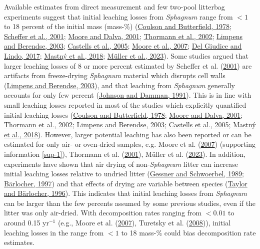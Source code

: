 \documentclass[
  12pt,
]{article}
\begin{document}
Available estimates from direct measurement and few two-pool litterbag experiments suggest that initial leaching losses from \emph{Sphagnum} range from \(<1\) to 18 percent of the initial mass (mass-\%) (\protect\hyperlink{ref-Coulson.1978}{Coulson and Butterfield, 1978}; \protect\hyperlink{ref-Scheffer.2001}{Scheffer et al., 2001}; \protect\hyperlink{ref-Moore.2001}{Moore and Dalva, 2001}; \protect\hyperlink{ref-Thormann.2002}{Thormann et al., 2002}; \protect\hyperlink{ref-Limpens.2003}{Limpens and Berendse, 2003}; \protect\hyperlink{ref-Castells.2005}{Castells et al., 2005}; \protect\hyperlink{ref-Moore.2007}{Moore et al., 2007}; \protect\hyperlink{ref-DelGiudice.2017}{Del Giudice and Lindo, 2017}; \protect\hyperlink{ref-Mastny.2018}{Mastný et al., 2018}; \protect\hyperlink{ref-Muller.2023}{Müller et al., 2023}). Some studies argued that larger leaching losses of 8 or more percent estimated by Scheffer et al. (\protect\hyperlink{ref-Scheffer.2001}{2001}) are artifacts from freeze-drying \emph{Sphagnum} material which disrupts cell walls (\protect\hyperlink{ref-Limpens.2003}{Limpens and Berendse, 2003}), and that leaching from \emph{Sphagnum} generally accounts for only few percent (\protect\hyperlink{ref-Johnson.1991}{Johnson and Damman, 1991}). This is in line with small leaching losses reported in most of the studies which explicitly quantified initial leaching losses (\protect\hyperlink{ref-Coulson.1978}{Coulson and Butterfield, 1978}; \protect\hyperlink{ref-Moore.2001}{Moore and Dalva, 2001}; \protect\hyperlink{ref-Thormann.2002}{Thormann et al., 2002}; \protect\hyperlink{ref-Limpens.2003}{Limpens and Berendse, 2003}; \protect\hyperlink{ref-Castells.2005}{Castells et al., 2005}; \protect\hyperlink{ref-Mastny.2018}{Mastný et al., 2018}). However, larger potential leaching has also been reported or can be estimated for only air- or oven-dried samples, e.g. Moore et al. (\protect\hyperlink{ref-Moore.2007}{2007}) (supporting information \ref{sup-1}), Thormann et al. (\protect\hyperlink{ref-Thormann.2001}{2001}), Müller et al. (\protect\hyperlink{ref-Muller.2023}{2023}). In addition, experiments have shown that air drying of non-\emph{Sphagnum} litter can increase initial leaching losses relative to undried litter (\protect\hyperlink{ref-Gessner.1989}{Gessner and Schwoerbel, 1989}; \protect\hyperlink{ref-Barlocher.1997}{Bärlocher, 1997}) and that effects of drying are variable between species (\protect\hyperlink{ref-Taylor.1996}{Taylor and Bärlocher, 1996}). This indicates that initial leaching losses from \emph{Sphagnum} can be larger than the few percents assumed by some previous studies, even if the litter was only air-dried. With decomposition rates ranging from \(<0.01\) to around 0.15 yr\(^{-1}\) (e.g., Moore et al. (\protect\hyperlink{ref-Moore.2007}{2007}), Turetsky et al. (\protect\hyperlink{ref-Turetsky.2008}{2008})), initial leaching losses in the range from \(<1\) to 18 mass-\% could bias decomposition rate estimates.
\end{document}
